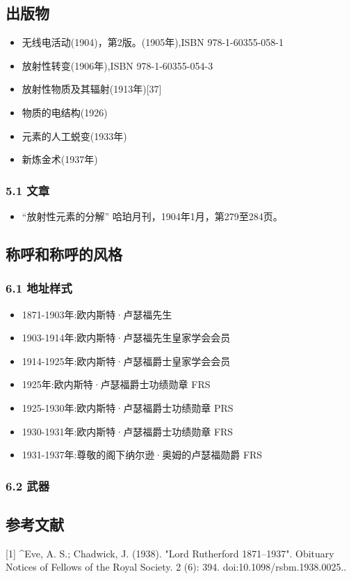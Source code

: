 \subsection{出版物}
\begin{itemize}
\item 无线电活动(1904)，第2版。(1905年),ISBN 978-1-60355-058-1
\item 放射性转变(1906年),ISBN 978-1-60355-054-3
\item 放射性物质及其辐射(1913年)[37]
\item 物质的电结构(1926)
\item 元素的人工蜕变(1933年)
\item 新炼金术(1937年)
\end{itemize}

\subsubsection{5.1 文章}
\begin{itemize}
\item “放射性元素的分解” 哈珀月刊，1904年1月，第279至284页。
\end{itemize}

\subsection{称呼和称呼的风格}
\subsubsection{6.1 地址样式}
\begin{itemize}
\item 1871-1903年:欧内斯特·卢瑟福先生
\item 1903-1914年:欧内斯特·卢瑟福先生皇家学会会员
\item 1914-1925年:欧内斯特·卢瑟福爵士皇家学会会员
\item 1925年:欧内斯特·卢瑟福爵士功绩勋章 FRS
\item 1925-1930年:欧内斯特·卢瑟福爵士功绩勋章 PRS
\item 1930-1931年:欧内斯特·卢瑟福爵士功绩勋章 FRS
\item 1931-1937年:尊敬的阁下纳尔逊·奥姆的卢瑟福勋爵 FRS
\end{itemize}

\subsubsection{6.2 武器}
\subsection{参考文献}
[1]
^Eve, A. S.; Chadwick, J. (1938). "Lord Rutherford 1871–1937". Obituary Notices of Fellows of the Royal Society. 2 (6): 394. doi:10.1098/rsbm.1938.0025..

